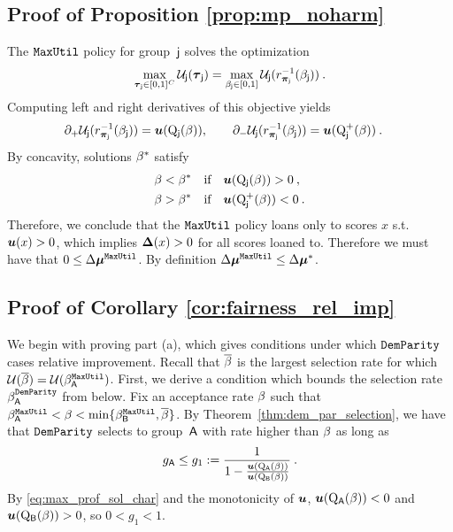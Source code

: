 \subsection{Proof of Proposition \ref{prop:mp_noharm}}
	The $\mathtt{MaxUtil}$ policy for group~$\mathsf{j}$ solves the optimization
	\begin{eqnarray*}
	\max_{\boldsymbol{\tau}_{\mathsf{j}} \in [0,1]^{C}} \mathcal{U}_{\mathsf{j}}(\boldsymbol{\tau}_{\mathsf{j}}) = \max_{\beta_{\mathsf{j}} \in [0,1]} \mathcal{U}_{\mathsf{j}}(r_{\boldsymbol{\pi}_{\mathsf{j}}}^{-1}(\beta_{\mathsf{j}}))\:.
	\end{eqnarray*}
	Computing left and right derivatives of this objective yields
	\begin{align*}
		\partial_+ \mathcal{U}_{\mathsf{j}}(r_{\boldsymbol{\pi}_{\mathsf{j}}}^{-1}(\beta_{\mathsf{j}})) &= \boldsymbol{u}(\mathrm{Q}_{\mathsf{j}}(\beta)), \qquad \partial_- \mathcal{U}_{\mathsf{j}}(r_{\boldsymbol{\pi}_{\mathsf{j}}}^{-1}(\beta_{\mathsf{j}})) = \boldsymbol{u}(\mathrm{Q}^+_{\mathsf{j}}(\beta))\:.
	\end{align*}
		By concavity, solutions $\beta^*$ satisfy
		\begin{align}
		\begin{split}\label{eq:max_prof_sol_char}
		\beta < \beta^* \quad&\text{if}\quad \boldsymbol{u}(\mathrm{Q}_{\mathsf{j}}(\beta)) > 0 \:,\\
		\beta > \beta^* \quad&\text{if}\quad \boldsymbol{u}(\mathrm{Q}^+_{\mathsf{j}}(\beta)) < 0 \:.
		\end{split}
		\end{align}
	Therefore, we conclude that the $\mathtt{MaxUtil}$ policy loans only to scores $x$ s.t. $\boldsymbol{u}(x) > 0$, which implies $\boldsymbol{\Delta}(x) > 0$ for all scores loaned to. Therefore we must have that $ 0\leq \Delta\boldsymbol{\mu}^{\mathtt{MaxUtil}} $. By definition $\Delta\boldsymbol{\mu}^{\mathtt{MaxUtil}} \leq \Delta\boldsymbol{\mu}^*$.
	
\subsection{Proof of Corollary \ref{cor:fairness_rel_imp} }
	
		We begin with proving part (a), which gives conditions under which $\mathtt{DemParity}$ cases relative improvement. Recall that $\overline{\beta}$ is the largest selection rate for which $\mathcal{U}(\overline{\beta}) = \mathcal{U}(\beta_{\mathsf{A}}^{\mathtt{MaxUtil}})$. First, we derive a condition which bounds the selection rate $\beta^{\mathtt{DemParity}}_{\mathsf{A}}$ from below. Fix an acceptance rate $\beta$ such that $\beta_{\mathsf{A}}^{\mathtt{MaxUtil}}<\beta<\min\{\beta_{\mathsf{B}}^{\mathtt{MaxUtil}}, \overline{\beta}\}$. By Theorem~\ref{thm:dem_par_selection}, we have that $\mathtt{DemParity}$ selects to group~$\mathsf{A}$ with rate higher than $\beta$ as long as
		\begin{eqnarray*}
		g_{\mathsf{A}} \leq g_1 := \frac{1}{1-\frac{\boldsymbol{u}(\mathrm{Q}_{\mathsf{A}}(\beta))}{\boldsymbol{u}(\mathrm{Q}_{\mathsf{B}}(\beta))}}\:.
		\end{eqnarray*}
		By \eqref{eq:max_prof_sol_char} and the monotonicity of $\boldsymbol{u}$, $\boldsymbol{u}(\mathrm{Q}_{\mathsf{A}}(\beta))<0$ and $\boldsymbol{u}(\mathrm{Q}_{\mathsf{B}}(\beta))>0$, so $0<g_1<1$. 

